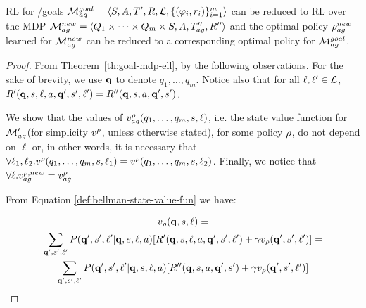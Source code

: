 \begin{theorem}\label{th:goal-mdp}
	RL for \LTLf /\LDLf goals
	$\mathcal{M}_{ag}^{goal}= \langle S, A, T', R, \mathcal{L},
	\{(\varphi_i,r_i)\}_{i=1}^{m} \rangle$ can be reduced to RL over the
	MDP $\mathcal{M}_{ag}^{new}=\langle Q_1\times\cdots\times Q_m \times S, A,T''_{ag},R'' \rangle$
	and the optimal policy $\rho_{ag}^{new}$ learned for $\mathcal{M}_{ag}^{new}$ can be reduced to a corresponding optimal policy for $\mathcal{M}_{ag}^{goal}$. 
\end{theorem}

\begin{proof}
	From  Theorem~\ref{th:goal-mdp-ell}, by the following observations. For the sake of brevity, we use $\mathbf{q}$ to denote $q_1, \dots, q_m$.
	Notice also that for all $\ell, \ell'\in\mathcal{L}$, $R'(\mathbf{q},s,\ell, a,\mathbf{q}', s', \ell')=R''(\mathbf{q},s,a,\mathbf{q}', s')$.
	
	We show that the values of $v_{ag}^{\rho}(q_1,\ldots,q_m, s,\ell)$, i.e. the state value function for $\mathcal{M}'_{ag}$(for simplicity $v^\rho$, unless otherwise stated), for some policy $\rho$, do not depend on $\ell$ or, in other words, it is necessary that $\forall \ell_1, \ell_2.v^\rho(q_1,\ldots,q_m, s, \ell_1) =v^\rho(q_1,\ldots,q_m, s, \ell_2)$. Finally, we notice that $\forall \ell. v_{ag}^{\rho, new} = v_{ag}^{\rho}$
	
	From Equation \ref{def:bellman-state-value-fun} we have:
	
	\begin{gather}	
	v_\rho(\mathbf{q}, s, \ell) = \nonumber\\
	\sum_{\mathbf{q}', s', \ell'} P(\mathbf{q}', s', \ell' | \mathbf{q}, s, \ell, a)[R'(\mathbf{q},s,\ell, a,\mathbf{q}', s', \ell') + \gamma v_\rho(\mathbf{q}', s', \ell')] = \nonumber\\
	\sum_{\mathbf{q}', s', \ell'} P(\mathbf{q}', s', \ell' | \mathbf{q}, s, \ell, a)[R''(\mathbf{q},s, a,\mathbf{q}', s') + \gamma v_\rho(\mathbf{q}', s', \ell')] \label{proof-step-1:goal-mdp-ell}
	\end{gather}
	

\end{proof}
